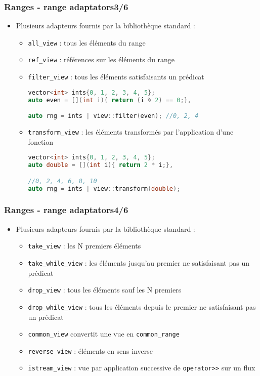 \documentclass[C++.tex]{subfiles}
\begin{document}
\begin{frame}[fragile]
	\frametitle{Ranges - range adaptators\titlehfill{}3/6}
	\begin{itemize}
		\item Plusieurs adapteurs fournis par la bibliothèque standard :


		\begin{itemize}
			\item \lstinline|all_view| : tous les éléments du range
			\item \lstinline|ref_view| : références sur les éléments du range
			\item \lstinline|filter_view| : tous les éléments satisfaisants un prédicat

			\begin{lstlisting}[language=C++]
vector<int> ints{0, 1, 2, 3, 4, 5};
auto even = [](int i){ return (i % 2) == 0;},

auto rng = ints | view::filter(even); //0, 2, 4\end{lstlisting}
 
			\item \lstinline|transform_view| : les éléments transformés par l'application d'une fonction 
			\begin{lstlisting}[language=C++]
vector<int> ints{0, 1, 2, 3, 4, 5};
auto double = [](int i){ return 2 * i;},

//0, 2, 4, 6, 8, 10
auto rng = ints | view::transform(double);\end{lstlisting}
		\end{itemize}
	\end{itemize}
\end{frame}

\begin{frame}[fragile]
	\frametitle{Ranges - range adaptators\titlehfill{}4/6}
	\begin{itemize}
		\item Plusieurs adapteurs fournis par la bibliothèque standard :

		\begin{itemize}
			\item \lstinline|take_view| : les N premiers éléments
			\item \lstinline|take_while_view| : les éléments jusqu'au premier ne satisfaisant pas un prédicat
			\item \lstinline|drop_view| : tous les éléments sauf les N premiers
			\item \lstinline|drop_while_view| : tous les éléments depuis le premier ne satisfaisant pas un prédicat
			\item \lstinline|common_view| convertit une vue en \lstinline|common_range|
			\item \lstinline|reverse_view| : éléments en sens inverse
			\item \lstinline|istream_view| : vue par application successive de \lstinline|operator>>| sur un flux
		\end{itemize}
	\end{itemize}
\end{frame}
\end{document}
